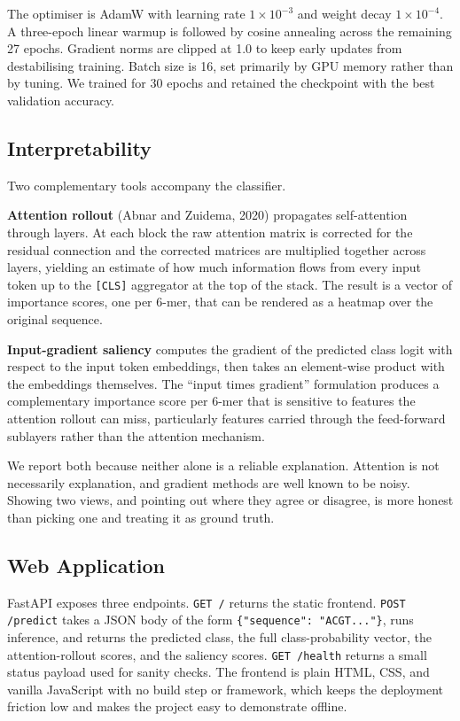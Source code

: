 \documentclass[11pt,a4paper]{article}
\begin{document}
The optimiser is AdamW with learning rate $1 \times 10^{-3}$ and weight decay $1 \times 10^{-4}$. A three-epoch linear warmup is followed by cosine annealing across the remaining 27 epochs. Gradient norms are clipped at 1.0 to keep early updates from destabilising training. Batch size is 16, set primarily by GPU memory rather than by tuning. We trained for 30 epochs and retained the checkpoint with the best validation accuracy.

\subsection{Interpretability}

Two complementary tools accompany the classifier.

\textbf{Attention rollout} (Abnar and Zuidema, 2020) propagates self-attention through layers. At each block the raw attention matrix is corrected for the residual connection and the corrected matrices are multiplied together across layers, yielding an estimate of how much information flows from every input token up to the \texttt{[CLS]} aggregator at the top of the stack. The result is a vector of importance scores, one per 6-mer, that can be rendered as a heatmap over the original sequence.

\textbf{Input-gradient saliency} computes the gradient of the predicted class logit with respect to the input token embeddings, then takes an element-wise product with the embeddings themselves. The ``input times gradient'' formulation produces a complementary importance score per 6-mer that is sensitive to features the attention rollout can miss, particularly features carried through the feed-forward sublayers rather than the attention mechanism.

We report both because neither alone is a reliable explanation. Attention is not necessarily explanation, and gradient methods are well known to be noisy. Showing two views, and pointing out where they agree or disagree, is more honest than picking one and treating it as ground truth.

\subsection{Web Application}

FastAPI exposes three endpoints. \texttt{GET /} returns the static frontend. \texttt{POST /predict} takes a JSON body of the form \texttt{\{"sequence": "ACGT..."\}}, runs inference, and returns the predicted class, the full class-probability vector, the attention-rollout scores, and the saliency scores. \texttt{GET /health} returns a small status payload used for sanity checks. The frontend is plain HTML, CSS, and vanilla JavaScript with no build step or framework, which keeps the deployment friction low and makes the project easy to demonstrate offline.
\end{document}

